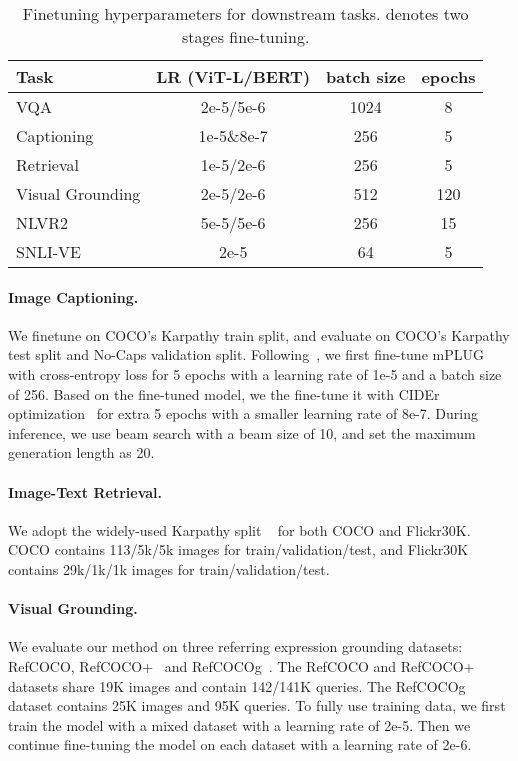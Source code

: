 \documentclass[11pt]{article}
\newcommand{\modelname}{mPLUG }
\begin{document}
\begin{table}
\setlength\tabcolsep{2pt}
\centering
\small
\begin{tabular}{l|ccc}
\toprule
Task  &  LR (ViT-L/BERT) & batch size & epochs  \\
\midrule
VQA & 2e-5/5e-6 & 1024 &  8 \\
Captioning & 1e-5\&8e-7 & 256& 5 \\
Retrieval & 1e-5/2e-6 & 256& 5 \\
Visual Grounding & 2e-5/2e-6 & 512& 120 \\
NLVR2 & 5e-5/5e-6 & 256 & 15 \\
SNLI-VE & 2e-5 & 64&  5 \\
\bottomrule
\end{tabular} 
\caption{Finetuning hyperparameters for downstream tasks.  denotes two stages fine-tuning.}
\label{table:finetune-hyper}
\end{table}

\paragraph{Image Captioning.} We finetune on COCO’s Karpathy train split, and evaluate on COCO’s Karpathy test split and No-Caps validation split. Following~\cite{li2020oscar,wang2022OFA}, we first fine-tune \modelname with cross-entropy loss for 5 epochs with a learning rate of 1e-5 and a batch size of 256. Based on the fine-tuned model, we the fine-tune it with CIDEr optimization~\cite{scst} for extra 5 epochs with a smaller learning rate of 8e-7. During inference, we use beam search with a beam size of 10, and set the maximum generation length as 20.

\paragraph{Image-Text Retrieval.} We adopt the widely-used Karpathy split ~\citep{karpathy2015deep} for both COCO and Flickr30K. COCO contains 113/5k/5k images for train/validation/test, and Flickr30K contains 29k/1k/1k images for train/validation/test.

\paragraph{Visual Grounding.} We evaluate our method on three referring expression grounding datasets: RefCOCO, RefCOCO+~\cite{yu2016modeling} and RefCOCOg~\cite{mao2016generation}. The RefCOCO and RefCOCO+ datasets share 19K images and contain 142/141K queries. The RefCOCOg dataset contains 25K images and 95K queries.
To fully use training data, we first train the model with a mixed dataset with a learning rate of 2e-5. Then we continue fine-tuning the model on each dataset with a learning rate of 2e-6.
\end{document}
